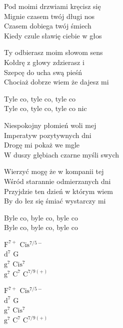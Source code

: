 \begin{text}
    Pod moimi drzwiami kręcisz się\\
    Mignie czasem twój długi nos\\
    Czasem dobiega twój śmiech\\
    Kiedy czule sławię ciebie w głos

    Ty odbierasz moim słowom sens\\
    Kołdrę z głowy zdzierasz i\\
    Szepcę do ucha swą pieśń\\
    Chociaż dobrze wiem że dajesz mi

    Tyle co, tyle co, tyle co\\
    Tyle co, tyle co, tyle co nic

    Niespokojny płomień woli mej\\
    Imperatyw pozytywnych dni\\
    Drogę mi pokaż we mgle\\
    W duszy głębiach czarne myśli swych

    Wierzyć mogę że w kompanii tej\\
    Wśród starannie odmierzanych dni\\
    Przyjdzie ten dzień w którym wiem\\
    By do łez się śmiać wystarczy mi

    Byle co, byle co, byle co\\
    Byle co, byle co, byle co
\end{text}
\begin{chord}
    $\mathrm{F^{7+}}$ $\mathrm{Cis^{7/5-}}$\\
    $\mathrm{d^7}$ G\\
    $\mathrm{g^7}$ $\mathrm{Cis^7}$\\
    $\mathrm{g^7}$ $\mathrm{C^7}$ $\mathrm{C^{7/9(+)}}$

    $\mathrm{F^{7+}}$ $\mathrm{Cis^{7/5-}}$\\
    $\mathrm{d^7}$ G\\
    $\mathrm{g^7}$ $\mathrm{Cis^7}$\\
    $\mathrm{g^7}$ $\mathrm{C^7}$ $\mathrm{C^{7/9(+)}}$
\end{chord}
